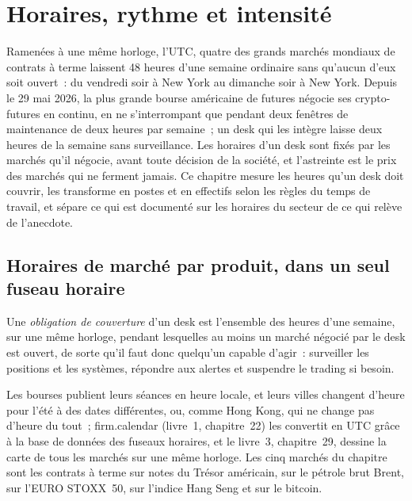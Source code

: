 \chapter{Horaires, rythme et intensité}\label{ch:in:hours-rhythm-and-intensity}

Ramenées à une même horloge, l'UTC, quatre des grands marchés mondiaux de contrats à terme laissent 48 heures d'une semaine ordinaire sans qu'aucun d'eux soit ouvert~:
du vendredi soir à New York au dimanche soir à New York. Depuis le 29 mai 2026, la plus grande bourse américaine de futures
négocie ses crypto-futures en continu, en ne s'interrompant que pendant deux fenêtres de maintenance de deux heures par semaine~; un desk qui les intègre
laisse deux heures de la semaine sans surveillance. Les horaires d'un desk sont fixés par les marchés qu'il négocie, avant toute décision de la société, et l'astreinte est le prix des marchés qui ne ferment jamais.
Ce chapitre mesure les heures qu'un desk doit couvrir, les transforme
en postes et en effectifs selon les règles du temps de travail, et
sépare ce qui est documenté sur les horaires du secteur de ce qui relève de l'anecdote.

\section{Horaires de marché par produit, dans un seul fuseau horaire}

\begin{definition}\label{def:in:hours-rhythm-and-intensity:coverage}
Une \emph{obligation de couverture} d'un desk est l'ensemble des heures d'une semaine, sur une même horloge, pendant lesquelles
au moins un marché négocié par le desk est ouvert, de sorte qu'il faut donc quelqu'un capable d'agir~: surveiller les positions et les systèmes,
répondre aux alertes et suspendre le trading si besoin.
\end{definition}

Les bourses publient leurs séances en heure locale, et leurs villes changent d'heure pour l'été à des dates différentes, ou, comme
Hong Kong, qui ne change pas d'heure du tout~; firm.calendar (livre~1, chapitre~22) les convertit en UTC grâce à la base de données des fuseaux horaires, et le livre~3,
chapitre~29, dessine la carte de tous les marchés sur une même horloge. Les cinq marchés du chapitre sont les contrats à terme sur notes du Trésor américain, sur le pétrole brut Brent,
sur l'EURO STOXX~50, sur l'indice Hang Seng et sur le bitcoin.

